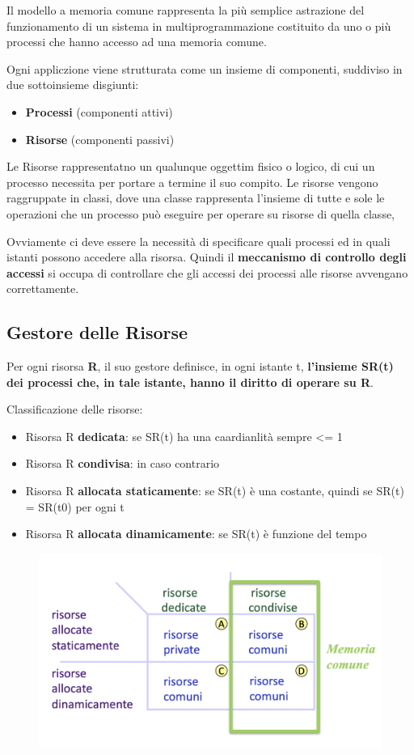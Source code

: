 \documentclass{article}
\begin{document}
Il modello a memoria comune rappresenta la più semplice astrazione del funzionamento di un sistema in multiprogrammazione costituito da uno o più processi che hanno accesso
ad una memoria comune.

Ogni appliczione viene strutturata come un insieme di componenti, suddiviso in due sottoinsieme disgiunti:
\begin{itemize}
    \item \textbf{Processi} (componenti attivi)
    \item \textbf{Risorse} (componenti passivi)
\end{itemize}

Le Risorse rappresentatno un qualunque oggettim fisico o logico, di cui un processo necessita per portare a termine il suo compito.
Le risorse vengono raggruppate in classi, dove una classe rappresenta l'insieme di tutte e sole le operazioni che un processo può eseguire per operare su risorse di quella classe,

Ovviamente ci deve essere la necessità di specificare quali processi ed in quali istanti possono accedere alla risorsa. Quindi il \textbf{meccanismo di controllo degli accessi}
si occupa di controllare che gli accessi dei processi alle risorse avvengano correttamente.

\subsection{Gestore delle Risorse}

Per ogni risorsa \textbf{R}, il suo gestore definisce, in ogni istante t, \textbf{l'insieme SR(t) dei processi che, in tale istante, hanno il diritto di operare su R}.

\vspace{5mm}

Classificazione delle risorse:
\begin{itemize}
    \item Risorsa R \textbf{dedicata}: se SR(t) ha una caardianlità sempre <= 1
    \item Risorsa R \textbf{condivisa}: in caso contrario
    \item Risorsa R \textbf{allocata staticamente}: se SR(t) è una costante, quindi se SR(t) = SR(t0) per ogni t
    \item Risorsa R \textbf{allocata dinamicamente}: se SR(t) è funzione del tempo
\end{itemize}

\begin{figure}[htbp]
    \centering
    \includegraphics[width=0.50\columnwidth]{imgs/tipologie_allocazione.png}
\end{figure}
\end{document}
